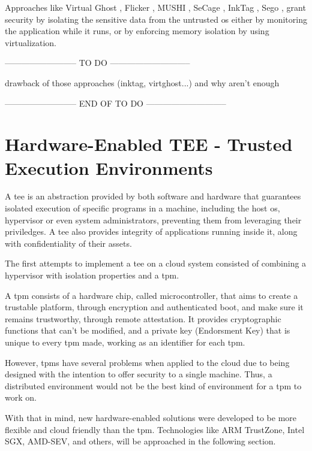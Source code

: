 Approaches like Virtual Ghost \cite{virtGhostPaper}, Flicker \cite{flickerPaper}, MUSHI \cite{mushiPaper}, SeCage \cite{SeCagePaper}, InkTag \cite{inkTagPaper}, Sego \cite{segoPaper}, grant security by isolating the sensitive data from the untrusted \gls{os} either by monitoring the application while it runs, or by enforcing memory isolation by using virtualization.

-------------------------- TO DO -----------------------------

			drawback of those approaches (inktag, virtghost...)
			and why aren't enough
			
-------------------------- END OF TO DO -----------------------------


\section{Hardware-Enabled TEE - Trusted Execution Environments}

A \gls{tee} is an abstraction provided by both software and hardware that guarantees isolated execution of specific programs in a machine, including the host \gls{os}, hypervisor or even system administrators, preventing them from leveraging their priviledges. A \gls{tee} also provides integrity of applications running inside it, along with confidentiality of their assets.

The first attempts to implement a \gls{tee} on a cloud system consisted of combining a hypervisor with isolation properties and a \gls{tpm}. 

A \gls{tpm} \cite{tpmPaper} consists of a hardware chip, called microcontroller, that aims to create a trustable platform, through encryption and authenticated boot, and make sure it remains trustworthy, through remote attestation. 
It provides cryptographic functions that can't be modified, and a private key (Endorsment Key) that is unique to every \gls{tpm} made, working as an identifier for each \gls{tpm}.

However, \gls{tpm}s have several problems when applied to the cloud due to being designed with the intention to offer security to a single machine. Thus, a distributed environment would not be the best kind of environment for a \gls{tpm} to work on.

With that in mind, new hardware-enabled solutions were developed to be more flexible and cloud friendly than the \gls{tpm}. Technologies like ARM TrustZone, Intel SGX, AMD-SEV, and others, will be approached in the following section.

